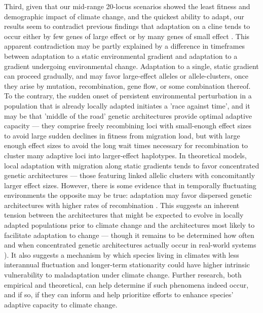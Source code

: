 \documentclass[9pt,twocolumn,twoside,lineno]{pnas-new}
\begin{document}
   
Third, given that our mid-range 20-locus scenarios
showed the least fitness and demographic impact of climate change,
and the quickest ability to adapt,
our results seem to contradict previous findings that adaptation on a cline tends to 
occur either by few genes of large effect or by many genes of small effect 
\cite{yeaman_amnat,yeaman_review}. 
This apparent contradiction may be partly explained by a 
difference in timeframes between adaptation to a static environmental gradient
and adaptation to a gradient undergoing environmental change. 
Adaptation to a single, static gradient can proceed gradually,
and may favor large-effect alleles or allele-clusters,
once they arise by mutation, recombination, gene flow, or some combination thereof. 
To the contrary, the sudden onset of persistent environmental perturbation 
in a population that is already locally adapted initiates a 'race against time', 
and it may be that 'middle of the road' genetic architectures provide
optimal adaptive capacity --- they comprise freely recombining loci with small-enough effect sizes to avoid large
sudden declines in fitness from migration load,
but with large enough effect sizes to avoid the long wait times necessary for recombination to cluster many adaptive loci into larger-effect haplotypes.
In theoretical models, local adaptation with migration along static 
gradients tends to favor concentrated genetic architectures ---
those featuring linked allelic clusters with concomitantly larger effect sizes.
However, there is some evidence that in temporally fluctuating environments the opposite may be true:
adaptation may favor dispersed genetic architectures with higher rates of recombination
\cite{burger,kondrashov,yeaman_review,yeaman_whitlock}.
This suggests an inherent tension between the architectures that
might be expected to evolve in locally adapted populations prior to climate change
and the architectures most likely to facilitate adaptation to change --- though it remains to be determined how 
often and when concentrated genetic architectures actually occur in 
real-world systems \cite{laruson}).
It also suggests a mechanism by which species living in climates with 
less interannual fluctuation and longer-term stationarity could have
higher intrinsic vulnerability to maladaptation under climate 
change. Further research, both empirical and theoretical,
can help determine if such phenomena indeed occur, and if so,
if they can inform and help prioritize efforts to enhance species'
adaptive capacity to climate change.
   
\end{document}
